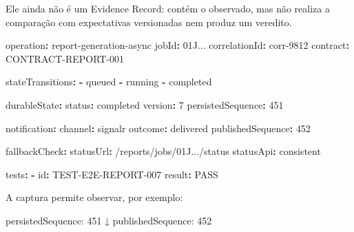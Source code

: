 \documentclass[
  10pt,
  a4paper,
  oneside]{book}
\newenvironment{Shaded}{}{}
\newcommand{\AttributeTok}[1]{\textcolor[rgb]{0.49,0.56,0.16}{#1}}
\newcommand{\DecValTok}[1]{\textcolor[rgb]{0.25,0.63,0.44}{#1}}
\newcommand{\FunctionTok}[1]{\textcolor[rgb]{0.02,0.16,0.49}{#1}}
\newcommand{\KeywordTok}[1]{\textcolor[rgb]{0.00,0.44,0.13}{\textbf{#1}}}
\newcommand{\NormalTok}[1]{#1}
\renewenvironment{Shaded}{\begin{snugshade}}{\end{snugshade}}%
\begin{document}
Ele ainda não é um Evidence Record: contém o observado, mas não realiza
a comparação com expectativas versionadas nem produz um veredito.

\begin{Shaded}
\begin{Highlighting}[]
\FunctionTok{operation}\KeywordTok{:}\AttributeTok{ report{-}generation{-}async}
\FunctionTok{jobId}\KeywordTok{:}\AttributeTok{ 01J...}
\FunctionTok{correlationId}\KeywordTok{:}\AttributeTok{ corr{-}9812}
\FunctionTok{contract}\KeywordTok{:}\AttributeTok{ CONTRACT{-}REPORT{-}001}

\FunctionTok{stateTransitions}\KeywordTok{:}
\AttributeTok{  }\KeywordTok{{-}}\AttributeTok{ queued}
\AttributeTok{  }\KeywordTok{{-}}\AttributeTok{ running}
\AttributeTok{  }\KeywordTok{{-}}\AttributeTok{ completed}

\FunctionTok{durableState}\KeywordTok{:}
\AttributeTok{  }\FunctionTok{status}\KeywordTok{:}\AttributeTok{ completed}
\AttributeTok{  }\FunctionTok{version}\KeywordTok{:}\AttributeTok{ }\DecValTok{7}
\AttributeTok{  }\FunctionTok{persistedSequence}\KeywordTok{:}\AttributeTok{ }\DecValTok{451}

\FunctionTok{notification}\KeywordTok{:}
\AttributeTok{  }\FunctionTok{channel}\KeywordTok{:}\AttributeTok{ signalr}
\AttributeTok{  }\FunctionTok{outcome}\KeywordTok{:}\AttributeTok{ delivered}
\AttributeTok{  }\FunctionTok{publishedSequence}\KeywordTok{:}\AttributeTok{ }\DecValTok{452}

\FunctionTok{fallbackCheck}\KeywordTok{:}
\AttributeTok{  }\FunctionTok{statusUrl}\KeywordTok{:}\AttributeTok{ /reports/jobs/01J.../status}
\AttributeTok{  }\FunctionTok{statusApi}\KeywordTok{:}\AttributeTok{ consistent}

\FunctionTok{tests}\KeywordTok{:}
\AttributeTok{  }\KeywordTok{{-}}\AttributeTok{ }\FunctionTok{id}\KeywordTok{:}\AttributeTok{ TEST{-}E2E{-}REPORT{-}007}
\AttributeTok{    }\FunctionTok{result}\KeywordTok{:}\AttributeTok{ PASS}
\end{Highlighting}
\end{Shaded}

A captura permite observar, por exemplo:

\begin{Shaded}
\begin{Highlighting}[]
\NormalTok{persistedSequence: 451}
\NormalTok{        ↓}
\NormalTok{publishedSequence: 452}
\end{Highlighting}
\end{Shaded}
\end{document}
